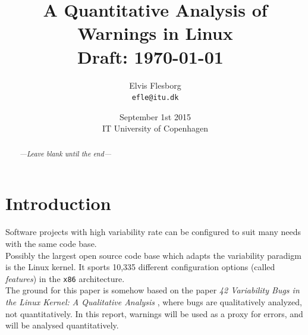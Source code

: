 \documentclass[a4paper,11pt]{report}
\begin{document}
\setlength{\parindent}{0cm}
\setlength{\unitlength}{1mm}

\date{September 1st 2015\\ IT University of Copenhagen}
\title{A Quantitative Analysis of Warnings in Linux \\ Draft: 
    \today~\currenttime}
\author{Elvis Flesborg\\
\texttt{efle@itu.dk}}
\clearpage\maketitle
\thispagestyle{empty}
\newpage

\tableofcontents
\thispagestyle{empty}



\newpage

\setcounter{page}{1}


\begin{abstract}
    \emph{---Leave blank until the end---}

\end{abstract}


\chapter{Introduction}
Software projects with high variability rate can be configured to suit many
needs with the same code base.
\\

Possibly the largest open source code base which adapts the variability paradigm
is the Linux kernel. It sports 10,335 different configuration options (called
\emph{features}) in the \texttt{x86} architecture.
\\

The ground for this paper is somehow based on the paper \emph{42 Variability 
Bugs in the Linux Kernel: A Qualitative Analysis}
    \cite{42bugs}
, where bugs are qualitatively analyzed, not quantitatively. In this report, 
warnings will be used as a proxy for errors, and will be analysed 
quantitatively.
\\
\end{document}
